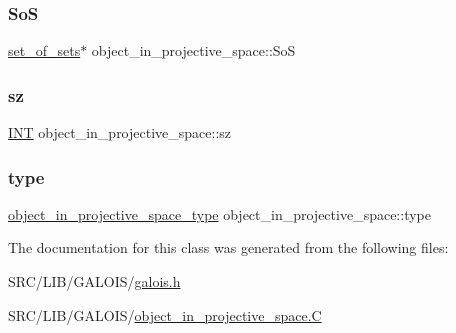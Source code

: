 \subsubsection{\texorpdfstring{SoS}{SoS}}
{\footnotesize\ttfamily \mbox{\hyperlink{classset__of__sets}{set\+\_\+of\+\_\+sets}}$\ast$ object\+\_\+in\+\_\+projective\+\_\+space\+::\+SoS}

\mbox{\label{classobject__in__projective__space_a2dda692174f30d566b26bf58e62c14cc}} 
\subsubsection{\texorpdfstring{sz}{sz}}
{\footnotesize\ttfamily \mbox{\hyperlink{galois_8h_a09fddde158a3a20bd2dcadb609de11dc}{I\+NT}} object\+\_\+in\+\_\+projective\+\_\+space\+::sz}

\mbox{\label{classobject__in__projective__space_a665c54b8efc5ff14ef98ed0f1591e060}} 
\subsubsection{\texorpdfstring{type}{type}}
{\footnotesize\ttfamily \mbox{\hyperlink{galois_8h_a1378bcef7b3c9092ebf659c58bc85f21}{object\+\_\+in\+\_\+projective\+\_\+space\+\_\+type}} object\+\_\+in\+\_\+projective\+\_\+space\+::type}



The documentation for this class was generated from the following files\+:\begin{DoxyCompactItemize}
\item 
S\+R\+C/\+L\+I\+B/\+G\+A\+L\+O\+I\+S/\mbox{\hyperlink{galois_8h}{galois.\+h}}\item 
S\+R\+C/\+L\+I\+B/\+G\+A\+L\+O\+I\+S/\mbox{\hyperlink{object__in__projective__space_8_c}{object\+\_\+in\+\_\+projective\+\_\+space.\+C}}\end{DoxyCompactItemize}
